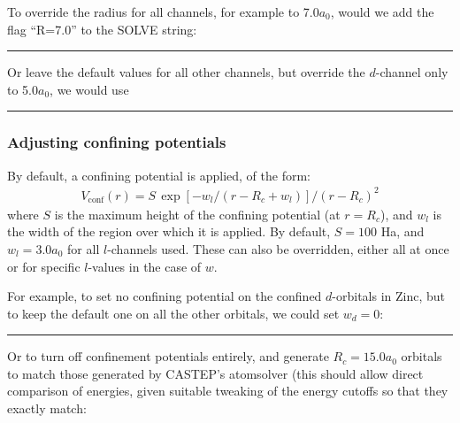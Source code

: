 \documentclass[letterpaper,10pt,english]{sphinxmanual}
\begin{document}
To override the radius for all channels, for example to
7.0\(a_{0}\), would we add the flag “R=7.0” to the SOLVE string:


\bigskip\hrule\bigskip





Or leave the default values for all other channels, but override the
\(d\)-channel only to 5.0\(a_{0}\), we would use


\bigskip\hrule\bigskip






\subsubsection{Adjusting confining potentials}
\label{\detokenize{pseudoatomic_solver:adjusting-confining-potentials}}
By default, a confining potential is applied, of the form:
\begin{equation*}
\begin{split}V_{\mathrm{conf}}(r)=S\,\exp[-w_{l}/(r-R_{c}+w_{l})]/(r-R_{c})^2\end{split}
\end{equation*}
where \(S\) is the maximum height of the confining potential (at
\(r=R_{c}\)), and \(w_{l}\) is the width of the region over
which it is applied. By default, \(S=100\) Ha,
and\(w_{l}=3.0a_{0}\) for all \(l\)-channels used. These can
also be overridden, either all at once or for specific \(l\)-values
in the case of \(w\).

For example, to set no confining potential on the confined
\(d\)-orbitals in Zinc, but to keep the default one on all the other
orbitals, we could set \(w_{d}=0\):


\bigskip\hrule\bigskip





Or to turn off confinement potentials entirely, and generate
\(R_{c}=15.0a_{0}\) orbitals to match those generated by CASTEP’s
atomsolver (this should allow direct comparison of energies, given
suitable tweaking of the energy cutoffs so that they exactly match:
\end{document}
